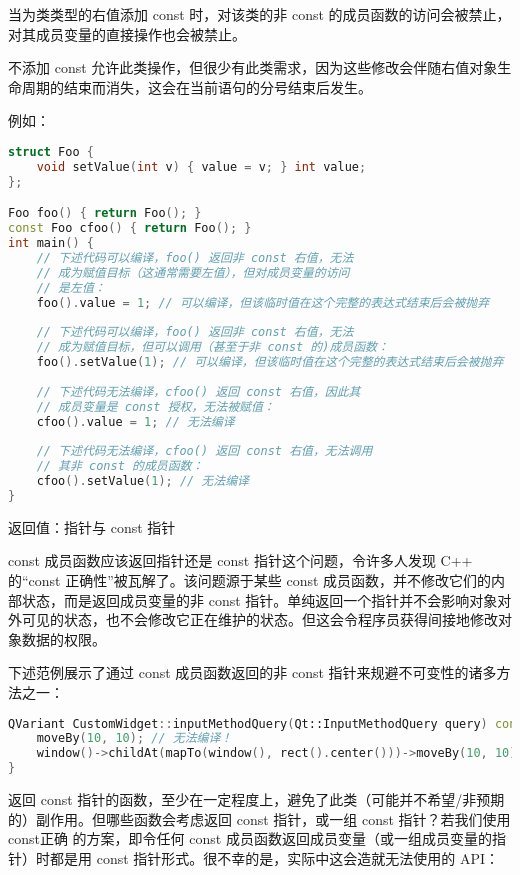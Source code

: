 当为类类型的右值添加 const 时，对该类的非 const 的成员函数的访问会被禁止，对其成员变量的直接操作也会被禁止。

不添加 const 允许此类操作，但很少有此类需求，因为这些修改会伴随右值对象生命周期的结束而消失，这会在当前语句的分号结束后发生。

例如：

\begin{lstlisting}[language=C++]
struct Foo {
	void setValue(int v) { value = v; } int value;
};

Foo foo() { return Foo(); }
const Foo cfoo() { return Foo(); }
int main() {
	// 下述代码可以编译，foo() 返回非 const 右值，无法
	// 成为赋值目标（这通常需要左值），但对成员变量的访问
	// 是左值：
	foo().value = 1; // 可以编译，但该临时值在这个完整的表达式结束后会被抛弃
	
	// 下述代码可以编译，foo() 返回非 const 右值，无法
	// 成为赋值目标，但可以调用（甚至于非 const 的)成员函数：
	foo().setValue(1); // 可以编译，但该临时值在这个完整的表达式结束后会被抛弃
	
	// 下述代码无法编译，cfoo() 返回 const 右值，因此其
	// 成员变量是 const 授权，无法被赋值：
	cfoo().value = 1; // 无法编译
	
	// 下述代码无法编译，cfoo() 返回 const 右值，无法调用
	// 其非 const 的成员函数：
	cfoo().setValue(1); // 无法编译
}
\end{lstlisting}

返回值：指针与 const 指针

const 成员函数应该返回指针还是 const 指针这个问题，令许多人发现 C++ 的“const 正确性”被瓦解了。该问题源于某些 const 成员函数，并不修改它们的内部状态，而是返回成员变量的非 const 指针。单纯返回一个指针并不会影响对象对外可见的状态，也不会修改它正在维护的状态。但这会令程序员获得间接地修改对象数据的权限。

下述范例展示了通过 const 成员函数返回的非 const 指针来规避不可变性的诸多方法之一：

\begin{lstlisting}[language=C++]
QVariant CustomWidget::inputMethodQuery(Qt::InputMethodQuery query) const {
	moveBy(10, 10); // 无法编译！
	window()->childAt(mapTo(window(), rect().center()))->moveBy(10, 10); // 可以编译！
}
\end{lstlisting}

返回 const 指针的函数，至少在一定程度上，避免了此类（可能并不希望/非预期的）副作用。但哪些函数会考虑返回 const 指针，或一组 const 指针？若我们使用 const正确 的方案，即令任何 const 成员函数返回成员变量（或一组成员变量的指针）时都是用 const 指针形式。很不幸的是，实际中这会造就无法使用的 API：


